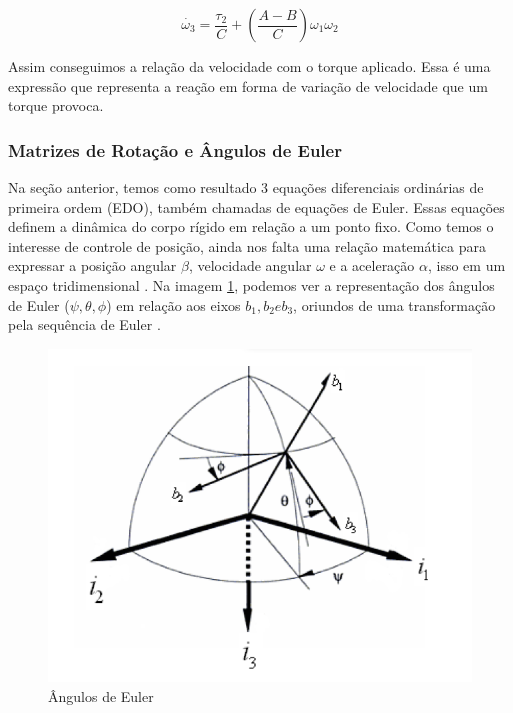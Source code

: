 \begin{equation}
  \dot{\omega_{3}}=\frac{\tau_{2}}{C}+\left(\frac{A-B}{C}\right)\omega_{1}\omega_{2}
\end{equation}

Assim conseguimos a relação da velocidade com o torque aplicado. Essa é uma expressão que representa a reação em forma de variação de velocidade que um torque provoca.


\subsubsection{Matrizes de Rotação e Ângulos de Euler}

Na seção anterior, temos como resultado 3 equações diferenciais ordinárias de primeira ordem (EDO), também chamadas de equações de Euler. Essas equações definem a dinâmica do corpo rígido em relação a um ponto fixo. Como temos o interesse de controle de posição, ainda nos falta uma relação matemática para expressar a posição angular $\beta$, velocidade angular $\omega$ e a aceleração $\alpha$, isso em um espaço tridimensional \cite{Snider}. Na imagem \ref{fig:coordenada}, podemos ver a representação dos ângulos de Euler ($\psi, \theta, \phi$) em relação aos eixos $b_1, b_2 e b_3$, oriundos de uma transformação pela sequência de Euler \cite{BongWie2001}.

\begin{figure}[!ht]
  \caption{Ângulos de Euler}
  \begin{center}
      \includegraphics[scale=0.5]{img/euler_snider_p28}
  \end{center}
  \label{fig:coordenada}
\end{figure}


